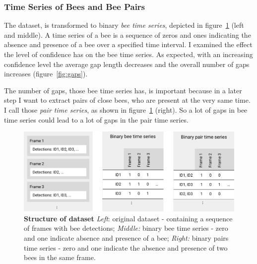 \subsubsection{Time Series of Bees and Bee Pairs}
\label{subsec:tracking}

The dataset, is transformed to binary \emph{bee time series}, depicted in figure~\ref{fig:structure} (left and middle). A time series of a bee is a sequence of zeros and ones indicating the absence and presence of a bee over a specified time interval. 
I examined the effect the level of confidence has on the bee time series.
As expected, with an increasing confidence level the average gap length decreases and the overall number of gaps increases (figure~\ref{fig:gaps}).

The number of gaps, those bee time series has, is important because in a later step I want to extract pairs of close bees, who are present at the very same time. I call those \emph{pair time series}, as shown in figure~\ref{fig:structure} (right). So a lot of gaps in bee time series could lead to a lot of gaps in the pair time series.

\begin{figure}[htb]
	\centering
	\includegraphics[width=1.0\textwidth]{Figures/structure}
	\caption[Structure of dataset]{\textbf{Structure of dataset} \emph{Left}: original dataset - containing a sequence of frames with bee detections; \emph{Middle:} binary bee time series - zero and one indicate absence and presence of a bee; \emph{Right:} binary pairs time series - zero and one indicate the absence and presence of two bees in the same frame.}
	\label{fig:structure}
\end{figure}

